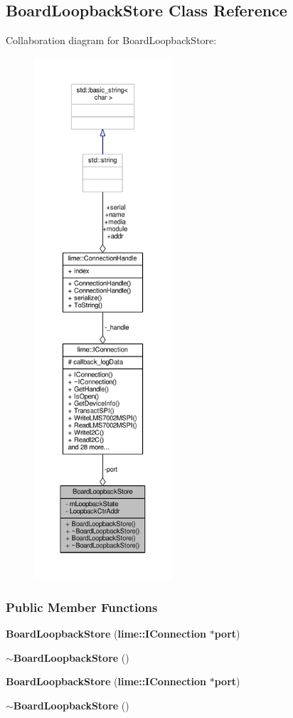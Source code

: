 \subsection{Board\+Loopback\+Store Class Reference}
\label{classBoardLoopbackStore}


Collaboration diagram for Board\+Loopback\+Store\+:
\nopagebreak
\begin{figure}[H]
\begin{center}
\leavevmode
\includegraphics[height=550pt]{d4/d71/classBoardLoopbackStore__coll__graph}
\end{center}
\end{figure}
\subsubsection*{Public Member Functions}
\begin{DoxyCompactItemize}
\item 
{\bf Board\+Loopback\+Store} ({\bf lime\+::\+I\+Connection} $\ast${\bf port})
\item 
{\bf $\sim$\+Board\+Loopback\+Store} ()
\item 
{\bf Board\+Loopback\+Store} ({\bf lime\+::\+I\+Connection} $\ast${\bf port})
\item 
{\bf $\sim$\+Board\+Loopback\+Store} ()
\end{DoxyCompactItemize}
